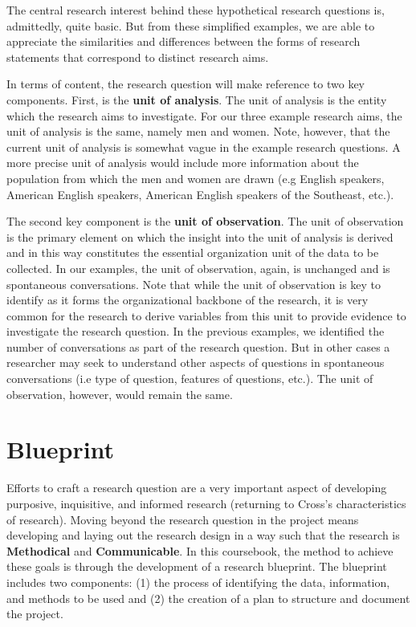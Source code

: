 \documentclass[
  letterpaper,
]{latex/krantz}
\begin{document}
The central research interest behind these hypothetical research
questions is, admittedly, quite basic. But from these simplified
examples, we are able to appreciate the similarities and differences
between the forms of research statements that correspond to distinct
research aims.

In terms of content, the research question will make reference to two
key components. First, is the \textbf{unit of analysis}. The unit of
analysis is the entity which the research aims to investigate. For our
three example research aims, the unit of analysis is the same, namely
men and women. Note, however, that the current unit of analysis is
somewhat vague in the example research questions. A more precise unit of
analysis would include more information about the population from which
the men and women are drawn (e.g English speakers, American English
speakers, American English speakers of the Southeast, etc.).

The second key component is the \textbf{unit of observation}. The unit
of observation is the primary element on which the insight into the unit
of analysis is derived and in this way constitutes the essential
organization unit of the data to be collected. In our examples, the unit
of observation, again, is unchanged and is spontaneous conversations.
Note that while the unit of observation is key to identify as it forms
the organizational backbone of the research, it is very common for the
research to derive variables from this unit to provide evidence to
investigate the research question. In the previous examples, we
identified the number of conversations as part of the research question.
But in other cases a researcher may seek to understand other aspects of
questions in spontaneous conversations (i.e type of question, features
of questions, etc.). The unit of observation, however, would remain the
same.

\hypertarget{blueprint}{%
\section{Blueprint}\label{blueprint}}

Efforts to craft a research question are a very important aspect of
developing purposive, inquisitive, and informed research (returning to
Cross's characteristics of research). Moving beyond the research
question in the project means developing and laying out the research
design in a way such that the research is \textbf{Methodical} and
\textbf{Communicable}. In this coursebook, the method to achieve these
goals is through the development of a research blueprint. The blueprint
includes two components: (1) the process of identifying the data,
information, and methods to be used and (2) the creation of a plan to
structure and document the project.
\end{document}

